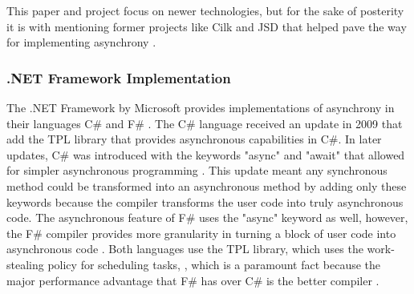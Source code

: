 This paper and project focus on newer technologies, but for the sake of posterity it is with mentioning former projects like Cilk and JSD that helped pave the way for implementing asynchrony \cite{sutcliffe1988jackson}\cite{Cameron1986}\cite{Frigo1998}.

\subsubsection{.NET Framework Implementation}

The .NET Framework by Microsoft provides implementations of asynchrony in their languages C\# and F\# \cite{syme2011f}\cite{Leijen2009}. The C\# language received an update in 2009 that add the TPL library that provides asynchronous capabilities in C\#. In later updates, C\# was introduced with the keywords "async" and "await" that allowed for simpler asynchronous programming \cite{alexdavies2012}. This update meant any synchronous method could be transformed into an asynchronous method by adding only these keywords because the compiler transforms the user code into truly asynchronous code. The asynchronous feature of F\# uses the "async" keyword as well, however, the F\# compiler provides more granularity in turning a block of user code into asynchronous code \cite{syme2011f}. Both languages use the TPL library, which uses the work-stealing policy for scheduling tasks, \cite{Leijen2009}\cite{msftVFS}, which is a paramount fact because the major performance advantage that F\# has over C\# is the better compiler \cite{syme2011f}.
